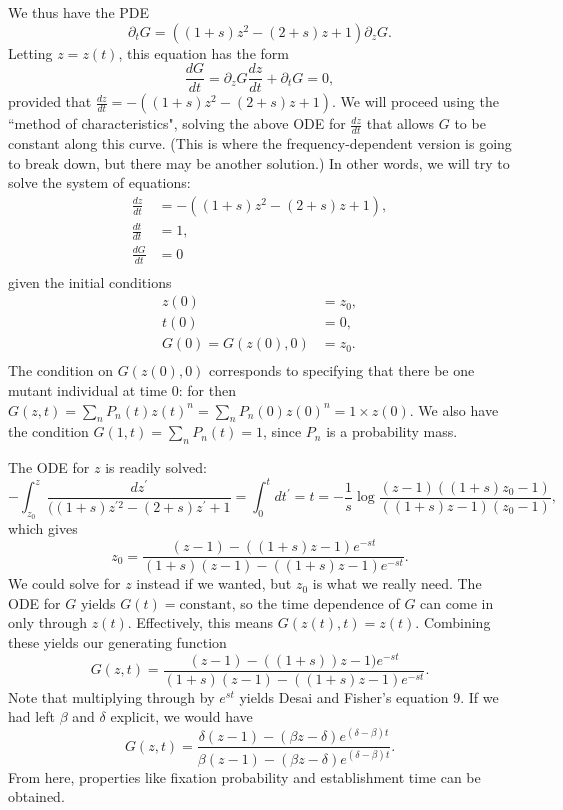 \documentclass[10pt]{revtex4}
\begin{document}
We thus have the PDE
\begin{equation}
\partial_t G = ((1+s)z^2 - (2+s)z + 1)\partial_z G.
\end{equation}
Letting $z = z(t)$, this equation has the form
\begin{equation}
\frac{dG}{dt} = \partial_z G \frac{dz}{dt} + \partial_t G = 0,
\end{equation}
provided that $\frac{dz}{dt} = -((1+s)z^2 - (2+s)z + 1)$.
We will proceed using the ``method of characteristics", solving the above ODE for $\frac{dz}{dt}$ that allows $G$ to be constant along this curve.
(This is where the frequency-dependent version is going to break down, but there may be another solution.)
In other words, we will try to solve the system of equations:
\begin{align}
\frac{dz}{dt} &= -((1+s)z^2 - (2+s)z + 1), \nonumber \\
\frac{dt}{dt} &= 1, \nonumber \\
\frac{dG}{dt} &= 0 \nonumber \\
\end{align}
given the initial conditions
\begin{align}
z(0) &= z_0, \nonumber \\
t(0) &= 0, \nonumber \\
G(0) = G(z(0),0) &= z_0. \nonumber \\
\end{align}
The condition on $G(z(0),0)$ corresponds to specifying that there be one mutant individual at time $0$: for then $G(z,t) = \sum_n P_n(t) z(t)^n = \sum_n P_n(0) z(0)^n = 1 \times z(0)$.
We also have the condition $G(1,t) = \sum_n P_n(t) = 1$, since $P_n$ is a probability mass.

The ODE for $z$ is readily solved:
\begin{equation}
-\int_{z_0}^z \frac{dz^\prime}{((1+s)z^{\prime 2} - (2+s)z^\prime + 1} = \int_0^t dt^\prime = t = -\frac{1}{s}\log\frac{(z-1)((1+s)z_0 - 1)}{((1+s)z-1)(z_0-1)},
\end{equation}
which gives
\begin{equation}
z_0 = \frac{(z-1)-((1+s) z - 1) e^{-st} }{(1+s)(z-1) - ((1+s) z - 1) e^{-st}}.
\end{equation}
We could solve for $z$ instead if we wanted, but $z_0$ is what we really need.
The ODE for $G$ yields $G(t) = \mathrm{constant}$, so the time dependence of $G$ can come in only through $z(t)$.
Effectively, this means $G(z(t),t) = z(t)$.
Combining these yields our generating function
\begin{equation}
G(z,t) = \frac{(z-1)-((1+s))z -1) e^{-st} }{(1+s)(z-1) - ((1+s) z - 1) e^{-st}}.
\end{equation}
Note that multiplying through by $e^{st}$ yields Desai and Fisher's equation 9.
If we had left $\beta$ and $\delta$ explicit, we would have
\begin{equation}
G(z,t) = \frac{\delta (z-1)-(\beta z - \delta) e^{(\delta - \beta) t} }{\beta(z-1) - (\beta z - \delta) e^{(\delta - \beta) t}}.
\end{equation}
From here, properties like fixation probability and establishment time can be obtained.
\end{document}
